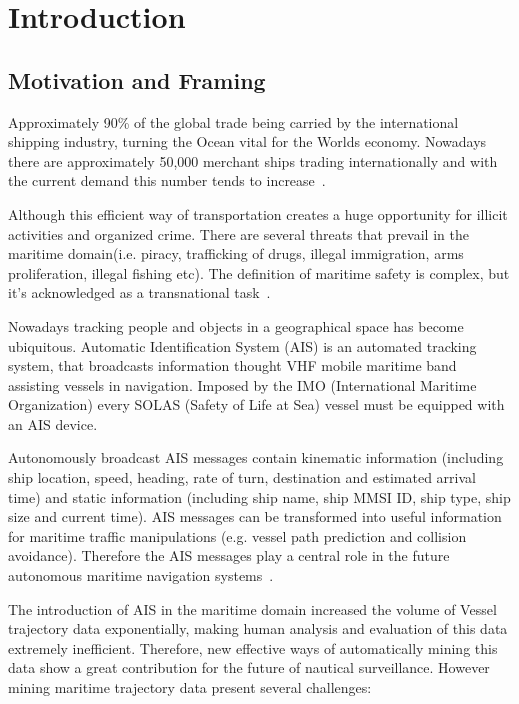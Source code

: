\chapter{Introduction}
\label{chapter:introduction}

\section{Motivation and Framing}
Approximately 90\% of the global trade being carried by the international shipping industry, turning the Ocean vital for the Worlds economy.
Nowadays there are approximately 50,000 merchant ships trading internationally and with the current demand this number tends to increase~\cite{ICS}.

Although this efficient way of transportation creates a huge opportunity for illicit activities and organized crime.
There are several threats that prevail in the maritime domain(i.e. piracy, trafficking of drugs, illegal immigration, arms proliferation, illegal fishing etc). The definition of maritime safety is complex, but it's acknowledged as a transnational task~\cite{Bueger2015}.

Nowadays tracking people and objects in a geographical space has become ubiquitous.
Automatic Identification System (AIS)\label{label_AIS} is an automated tracking system, that broadcasts information thought VHF mobile maritime band assisting vessels in navigation. 
Imposed by the IMO (International Maritime Organization)\label{label_IMO} every SOLAS
(Safety of Life at Sea) \label{label_SOLAS} vessel must be equipped with an AIS device.

Autonomously broadcast AIS messages contain kinematic information (including ship location, speed, heading, rate of turn, destination and estimated arrival time) and static information (including ship name, ship MMSI ID, ship type, ship size and current time). AIS messages can be transformed into useful information for maritime traffic manipulations (e.g. vessel path prediction and collision avoidance). Therefore the AIS messages play a central role in the future autonomous maritime navigation systems~\cite{Mao2016}.

The introduction of AIS in the maritime domain increased the volume of Vessel trajectory data exponentially, making human analysis and evaluation of this data extremely inefficient. Therefore, new effective ways of automatically mining this data show a great contribution for the future of nautical surveillance. However mining maritime trajectory data present several challenges: 

